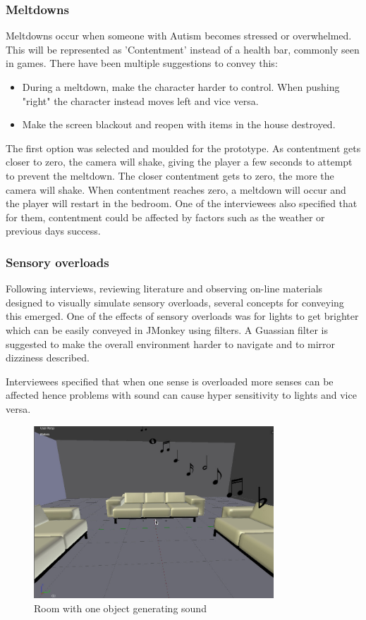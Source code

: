 \documentclass[11pt]{report}
\begin{document}
\subsubsection{Meltdowns}
Meltdowns occur when someone with Autism becomes stressed or overwhelmed. This will be represented as 'Contentment' instead of a health bar, commonly seen in games. There have been multiple suggestions to convey this:

\begin{itemize}
\item During a meltdown, make the character harder to control. When pushing "right" the character instead moves left and vice versa.
\item Make the screen blackout and reopen with items in the house destroyed.
\end{itemize}

The first option was selected and moulded for the prototype. As contentment gets closer to zero, the camera will shake, giving the player a few seconds to attempt to prevent the meltdown. The closer contentment gets to zero, the more the camera will shake. When contentment reaches zero, a meltdown will occur and the player will restart in the bedroom. One of the interviewees also specified that for them, contentment could be affected by factors such as the weather or previous days success. 

\subsubsection{Sensory overloads}
Following interviews, reviewing literature and observing on-line materials designed to visually simulate sensory overloads, several concepts for conveying this emerged. One of the effects of sensory overloads was for lights to get brighter which can be easily conveyed in JMonkey using filters. A Guassian filter is suggested to make the overall environment harder to navigate and to mirror dizziness described. 

Interviewees specified that when one sense is overloaded more senses can be affected hence problems with sound can cause hyper sensitivity to lights and vice versa.

\begin{figure}[H]
\centering
\includegraphics[width=90mm]{images/GD_basic.jpg}
\caption{Room with one object generating sound}
\label{sensorymockup1}
\end{figure}
\end{document}
